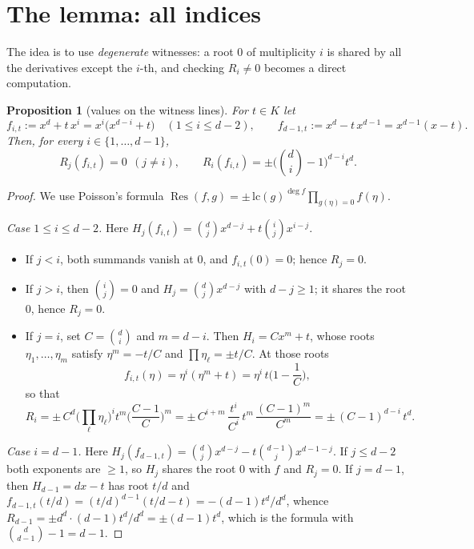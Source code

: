 \documentclass[11pt,reqno]{amsart}
\theoremstyle{plain}
\newtheorem{proposition}[theorem]{Proposition}
\theoremstyle{definition}
\DeclareMathOperator{\Res}{Res}
\begin{document}
\section{The lemma: all indices}

The idea is to use \emph{degenerate} witnesses: a root $0$ of multiplicity $i$ is
shared by all the derivatives except the $i$-th, and checking $R_i\neq0$ becomes
a direct computation.

\begin{proposition}[values on the witness lines]\label{prop:lines}
For $t\in K$ let
\[
  f_{i,t}:=x^d+t\,x^i=x^i\big(x^{d-i}+t\big)\quad(1\le i\le d-2),\qquad
  f_{d-1,t}:=x^d-t\,x^{d-1}=x^{d-1}(x-t).
\]
Then, for every $i\in\{1,\dots,d-1\}$,
\[
  R_j(f_{i,t})=0\ \ (j\neq i),\qquad
  R_i(f_{i,t})=\pm\Big(\binom{d}{i}-1\Big)^{d-i}t^{d}.
\]
\end{proposition}

\begin{proof}
We use Poisson's formula
$\Res(f,g)=\pm\,\mathrm{lc}(g)^{\deg f}\prod_{g(\eta)=0}f(\eta)$.

\emph{Case $1\le i\le d-2$.} Here
$H_j(f_{i,t})=\binom dj x^{d-j}+t\binom ij x^{i-j}$.
\begin{itemize}
\item If $j<i$, both summands vanish at $0$, and $f_{i,t}(0)=0$; hence $R_j=0$.
\item If $j>i$, then $\binom ij=0$ and $H_j=\binom dj x^{d-j}$ with $d-j\ge1$; it
  shares the root $0$, hence $R_j=0$.
\item If $j=i$, set $C=\binom di$ and $m=d-i$. Then $H_i=Cx^m+t$, whose roots
  $\eta_1,\dots,\eta_m$ satisfy $\eta^m=-t/C$ and $\prod\eta_\ell=\pm t/C$. At
  those roots
  \[
    f_{i,t}(\eta)=\eta^i(\eta^m+t)=\eta^i\,t\Big(1-\frac1C\Big),
  \]
  so that
  \[
    R_i=\pm\,C^{d}\Big(\prod_\ell\eta_\ell\Big)^{i}t^m\Big(\frac{C-1}{C}\Big)^m
       =\pm\,C^{i+m}\,\frac{t^i}{C^i}\,t^m\,\frac{(C-1)^m}{C^m}
       =\pm\,(C-1)^{d-i}\,t^d .
  \]
\end{itemize}

\emph{Case $i=d-1$.} Here
$H_j(f_{d-1,t})=\binom dj x^{d-j}-t\binom{d-1}{j}x^{d-1-j}$. If $j\le d-2$ both
exponents are $\ge1$, so $H_j$ shares the root $0$ with $f$ and $R_j=0$. If
$j=d-1$, then $H_{d-1}=dx-t$ has root $t/d$ and
$f_{d-1,t}(t/d)=(t/d)^{d-1}(t/d-t)=-(d-1)t^d/d^d$, whence
$R_{d-1}=\pm d^d\cdot(d-1)t^d/d^d=\pm(d-1)t^d$, which is the formula with
$\binom{d}{d-1}-1=d-1$.
\end{proof}
\end{document}
